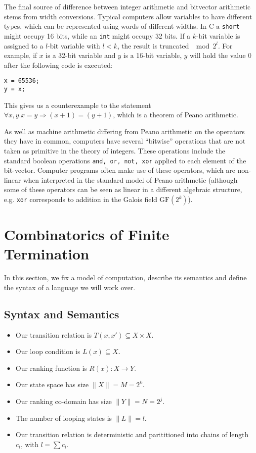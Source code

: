 \documentclass[preprint]{sigplanconf}
\theoremstyle{definition}
\begin{document}
The final source of difference between integer arithmetic and bitvector arithmetic stems from width conversions.
Typical computers allow variables to have different types, which can be represented using words of different widths.
In C a \texttt{short} might occupy
16 bits, while an \texttt{int} might occupy 32 bits.  If a $k$-bit variable is assigned to a $l$-bit variable
with $l < k$, the result is truncated $\mod 2^l$.  For example, if $x$ is a 32-bit variable and $y$ is a 16-bit
variable, $y$ will hold the value $0$ after the following code is executed:

\begin{lstlisting}
x = 65536;
y = x;
\end{lstlisting}

This gives us a counterexample to the statement $\forall x, y . x = y \Rightarrow (x + 1) = (y + 1)$,
which is a theorem of Peano arithmetic.

As well as machine arithmetic differing from Peano arithmetic on the operators they have in common,
computers have several ``bitwise'' operations that are not taken as primitive in the theory of
integers.  These operations include the standard boolean operations \texttt{and, or, not, xor}
applied to each element of the bit-vector.  Computer programs often make use of these operators,
which are non-linear when interpreted in the standard model of Peano arithmetic
(although some of these operators can be seen as linear in a different algebraic structure,
e.g. \texttt{xor} corresponds to addition in the Galois field $\mathrm{GF}(2^k)$).

\iffalse
\section{Combinatorics of Finite Termination}
In this section, we fix a model of computation, describe its semantics and
define the syntax of a language we will work over.

\subsection{Syntax and Semantics}

\begin{itemize}
 \item Our transition relation is $T(x, x') \subseteq X \times X$.
 \item Our loop condition is $L(x) \subseteq X$.
 \item Our ranking function is $R(x) : X \to Y$.
 \item Our state space has size $\| X \| = M = 2^k$.
 \item Our ranking co-domain has size $\| Y \| = N = 2^j$.
 \item The number of looping states is $\| L \| = l$.
 \item Our transition relation is deterministic and parititioned into chains of length $c_i$, with $l = \sum c_i$.
\end{itemize}
\end{document}
